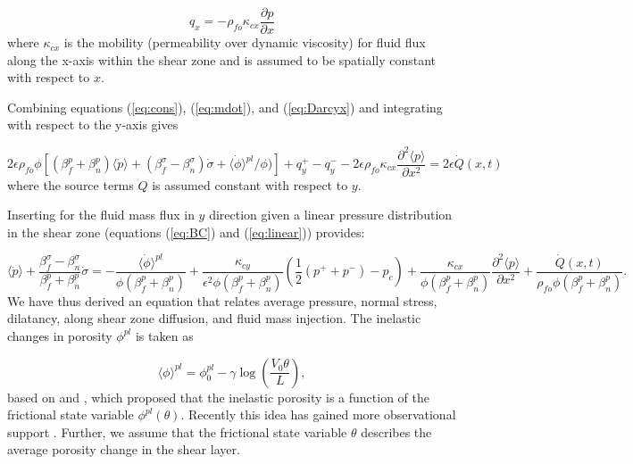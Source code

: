 \documentclass[draft]{agujournal2019}
\begin{document}
\begin{equation}
    q_x =   - \rho_{fo} \kappa_{cx}\frac{\partial p}{\partial x}
    \label{eq:Darcyx}
\end{equation}
where $\kappa_{cx}$ is the mobility (permeability over dynamic viscosity) for fluid flux along the x-axis within the shear zone and is assumed to be spatially constant with respect to $x$.

Combining equations (\ref{eq:cons}), (\ref{eq:mdot}), and (\ref{eq:Darcyx}) and integrating with respect to the y-axis gives

\begin{equation}
    2 \epsilon \rho_{fo} \phi \left[ (\beta_f^p + \beta_n^p ) \langle \dot{p} \rangle + (\beta_f^\sigma - \beta_n^{\sigma}) \dot{\sigma} + \langle \dot{\phi} \rangle^{pl}/\phi ) \right] + q_y^+ - q_y^- - 2 \epsilon \rho_{fo} \kappa_{cx} \frac{\partial^2 \langle p \rangle}{\partial x^2}  = 2 \epsilon \dot{Q}(x,t)
\end{equation}
where the source terms $Q$ is assumed constant with respect to $y$. 

Inserting for the fluid mass flux in $y$ direction given a linear pressure distribution in the shear zone (equations (\ref{eq:BC}) and (\ref{eq:linear})) provides:

\begin{equation}
      \langle \dot{p} \rangle + \frac{\beta_f^\sigma - \beta_n^{\sigma}}{\beta_f^p + \beta_n^p } \dot{\sigma}    =  - \frac{\langle \dot{\phi} \rangle^{pl}}{\phi (\beta_f^p + \beta_n^p )} + \frac{\kappa_{cy}}{\epsilon^2 \phi(\beta_f^p + \beta_n^p )} (\frac{1}{2}(p^+ + p^-) - p_c) + \frac{\kappa_{cx}}{\phi(\beta_f^p + \beta_n^p) } \frac{\partial^2 \langle p \rangle}{\partial x^2} + \frac{\dot{Q}(x,t)}{\rho_{fo}\phi(\beta_f^p + \beta_n^p)}.
     \label{eq:pc}
\end{equation}	
We have thus derived an equation that relates average pressure, normal stress, dilatancy, along shear zone diffusion, and fluid mass injection. The inelastic changes in porosity $\phi^{pl}$ is taken as

\begin{equation}
    \langle \phi \rangle^{pl} = \phi_0^{pl} -  \gamma \log \left( \frac{V_0 \theta}{L} \right),
    \label{eq:phidil}
\end{equation}
based on  and , which proposed that the inelastic porosity is a function of the frictional state variable $\phi^{pl} (\theta)$. Recently this idea has gained more observational support \cite{Proctor2020}. Further, we assume that the frictional state variable $\theta$ describes the average porosity change in the shear layer. 
\end{document}
